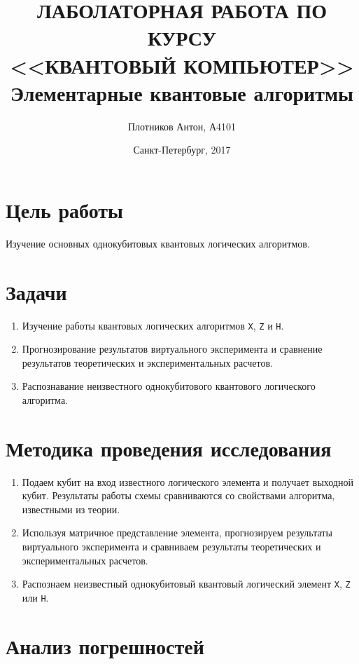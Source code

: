 \documentclass{article}
\title{ЛАБОЛАТОРНАЯ РАБОТА ПО КУРСУ\\ <<КВАНТОВЫЙ КОМПЬЮТЕР>>\\
Элементарные квантовые алгоритмы}
\date{Санкт-Петербург, 2017}
\author{Плотников Антон, А4101}
\begin{document}
\maketitle
\newpage

\section{Цель работы}
Изучение основных однокубитовых квантовых логических алгоритмов.

\section{Задачи}


\begin{enumerate}
  \item Изучение работы квантовых логических алгоритмов \verb|X|, \verb|Z| и 
    \verb|H|.

  \item Прогнозирование результатов виртуального эксперимента и сравнение
    результатов теоретических и экспериментальных расчетов.

  \item Распознавание неизвестного однокубитового квантового логического
    алгоритма.
\end{enumerate}

\section{Методика проведения исследования}

\begin{enumerate}
  \item Подаем кубит на вход известного логического элемента и получает
    выходной кубит. Результаты работы схемы сравниваются со свойствами
    алгоритма, известными из теории.

  \item Используя матричное представление элемента, прогнозируем результаты
    виртуального эксперимента и сравниваем результаты теоретических и
    экспериментальных расчетов.

  \item Распознаем неизвестный однокубитовый квантовый логический элемент
    \verb|X|, \verb|Z| или \verb|H|.
\end{enumerate}

\section{Анализ погрешностей}
\end{document}
